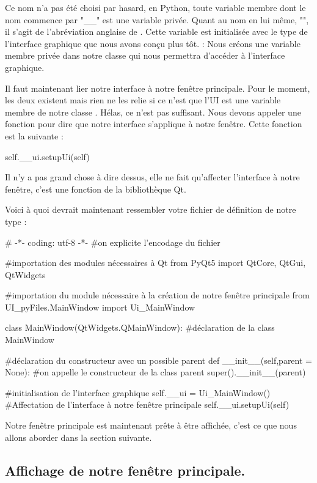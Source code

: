\documentclass[12pt]{report}    %
\begin{document}
Ce nom n'a pas été choisi par hasard, en Python, toute variable membre dont le nom commence par "\_\_" est une variable privée. Quant au nom en lui même,  "\textcolor{green}{}", il s'agit de l'abréviation anglaise de .\newline
Cette variable est initialisée avec le type de l'interface graphique que nous avons conçu plus tôt.\newline
{} : Nous créons une variable membre privée dans notre classe qui nous permettra d'accéder à l'interface graphique.\smallSkip

Il faut maintenant lier notre interface à notre fenêtre principale. Pour le moment, les deux existent mais rien ne les relie si ce n'est que l'UI est une variable membre de notre classe . Hélas, ce n'est pas suffisant. Nous devons appeler une fonction pour dire que notre interface s'applique à notre fenêtre. Cette fonction est la suivante :
\begin{pyCode}
self.__ui.setupUi(self)
\end{pyCode}
Il n'y a pas grand chose à dire dessus, elle ne fait qu'affecter l'interface à notre fenêtre, c'est une fonction de la bibliothèque Qt.\smallSkip

Voici à quoi devrait maintenant ressembler votre fichier de définition de notre type  :
\begin{pyCode}
# -*- coding: utf-8 -*-
#on explicite l’encodage du fichier

#importation des modules nécessaires à Qt
from PyQt5 import QtCore, QtGui, QtWidgets

#importation du module nécessaire à la création de notre fenêtre principale
from UI_pyFiles.MainWindow import Ui_MainWindow

class MainWindow(QtWidgets.QMainWindow): #déclaration de la class MainWindow

	#déclaration du constructeur avec un possible parent
	def __init__(self,parent = None):
		#on appelle le constructeur de la class parent
		super().__init__(parent)

		#initialisation de l'interface graphique
		self.__ui = Ui_MainWindow()
		#Affectation de l'interface à notre fenêtre principale
		self.__ui.setupUi(self)
\end{pyCode}


Notre fenêtre principale est maintenant prête à être affichée, c'est ce que nous allons aborder dans la section suivante.


\subsection{Affichage de notre fenêtre principale.}
\end{document}
